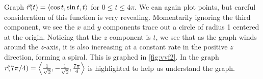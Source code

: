 \begin{example}\label{ex_vvf2}%
Graph $\vec r(t) =\left\langle \cos t,\sin t,t\right\rangle$ for $0\leq t\leq 4\pi$.
\solution
We can again plot points, but careful consideration of this function is very revealing. Momentarily ignoring the third component, we see the $x$ and $y$ components trace out a circle of radius 1 centered at the origin. Noticing that the $z$ component is $t$, we see that as the graph winds around the $z$-axis, it is also increasing at a constant rate in the positive $z$ direction, forming a spiral. This is graphed in \autoref{fig:vvf2}. In the graph $\vec r(7\pi/4)=\bracket{\frac1{\sqrt2},-\frac1{\sqrt2},\frac{7\pi}4}%
$ is highlighted to help us understand the graph.
\end{example}


%
%

